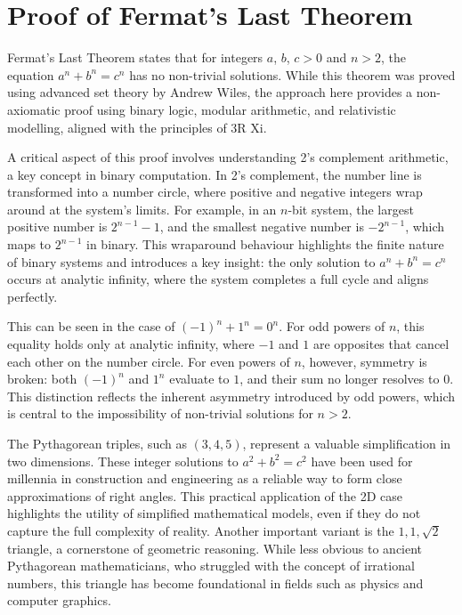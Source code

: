 \documentclass[12pt]{article}
\begin{document}
\section*{Proof of Fermat’s Last Theorem}

Fermat’s Last Theorem states that for integers \(a\), \(b\), \(c > 0\) and \(n > 2\), the equation \(a^n + b^n = c^n\) has no non-trivial solutions. While this theorem was proved using advanced set theory by Andrew Wiles, the approach here provides a non-axiomatic proof using binary logic, modular arithmetic, and relativistic modelling, aligned with the principles of 3R Xi.

A critical aspect of this proof involves understanding 2’s complement arithmetic, a key concept in binary computation. In 2’s complement, the number line is transformed into a number circle, where positive and negative integers wrap around at the system’s limits. For example, in an \(n\)-bit system, the largest positive number is \(2^{n-1} - 1\), and the smallest negative number is \(-2^{n-1}\), which maps to \(2^{n-1}\) in binary. This wraparound behaviour highlights the finite nature of binary systems and introduces a key insight: the only solution to \(a^n + b^n = c^n\) occurs at analytic infinity, where the system completes a full cycle and aligns perfectly.

This can be seen in the case of \((-1)^n + 1^n = 0^n\). For odd powers of \(n\), this equality holds only at analytic infinity, where \(-1\) and \(1\) are opposites that cancel each other on the number circle. For even powers of \(n\), however, symmetry is broken: both \((-1)^n\) and \(1^n\) evaluate to \(1\), and their sum no longer resolves to \(0\). This distinction reflects the inherent asymmetry introduced by odd powers, which is central to the impossibility of non-trivial solutions for \(n > 2\).

The Pythagorean triples, such as \((3, 4, 5)\), represent a valuable simplification in two dimensions. These integer solutions to \(a^2 + b^2 = c^2\) have been used for millennia in construction and engineering as a reliable way to form close approximations of right angles. This practical application of the 2D case highlights the utility of simplified mathematical models, even if they do not capture the full complexity of reality. Another important variant is the \(1, 1, \sqrt{2}\) triangle, a cornerstone of geometric reasoning. While less obvious to ancient Pythagorean mathematicians, who struggled with the concept of irrational numbers, this triangle has become foundational in fields such as physics and computer graphics.
\end{document}
